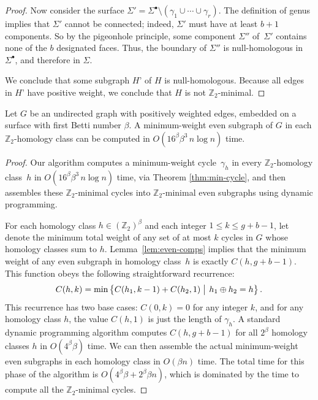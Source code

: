 \documentclass[letterpaper,review]{siamart190516}
\def\Z{\mathbb{Z}}
\begin{document}
{\begin{proof}
Now consider the surface $\Sigma' = \Sigma^\bullet \setminus (\gamma_1 \cup \cdots \cup \gamma_r)$.  The definition of genus implies that $\Sigma'$ cannot be connected; indeed, $\Sigma'$ must have at least $b+1$ components.  So by the pigeonhole principle, some component $\Sigma''$ of~$\Sigma'$ contains none of the $b$ designated faces.  Thus, the boundary of $\Sigma''$ is null-homologous in $\Sigma^\bullet$, and therefore in $\Sigma$.


We conclude that some subgraph $H’$ of $H$ is null-homologous.  Because all edges in $H’$ have positive weight, we conclude that $H$ is not $\Z_2$-minimal.
\end{proof}

\begin{theorem}
\label{thm:min-even}
Let $G$ be an undirected graph with positively weighted edges, embedded on a surface with first Betti number $\beta$.  A minimum-weight even subgraph of $G$ in each $\Z_2$-homology class can be computed in $O(16^\beta \beta^3\, n\log n)$ time.
\end{theorem}

\begin{proof}
Our algorithm computes a minimum-weight cycle~$\gamma_h$ in every $\Z_2$-homology class~$h$ in $O(16^\beta \beta^3\, n\log n)$ time, via Theorem \ref{thm:min-cycle}, and then assembles these $\Z_2$-minimal cycles into $\Z_2$-minimal even subgraphs using dynamic programming.

For each homology class $h\in (\Z_2)^\beta$ and each integer $1\le k\le g+b-1$, let  denote the minimum total weight of any set of at most $k$ cycles in $G$ whose homology classes sum to $h$.  Lemma~\ref{lem:even-comps} implies that the minimum weight of any even subgraph in homology class~$h$ is exactly $C(h, g+b-1)$.  This function obeys the following straightforward recurrence:
\[
	C(h,k) = \min\Setbar{C(h_1,k-1) + C(h_2, 1)\strut}{h_1\oplus h_2 = h}.
\]
This recurrence has two base cases: $C(0, k) = 0$ for any integer $k$, and for any homology class $h$, the value $C(h,1)$ is just the length of $\gamma_h$.  A standard dynamic programming algorithm computes $C(h, g+b-1)$ for all $2^\beta$ homology classes $h$ in $O(4^\beta \beta)$ time.  We can then assemble the actual minimum-weight even subgraphs in each homology class in $O(\beta n)$ time.  The total time for this phase of the algorithm is $O(4^\beta \beta + 2^\beta \beta n)$, which is dominated by the time to compute all the $\Z_2$-minimal cycles.
\end{proof}

}
\end{document}
